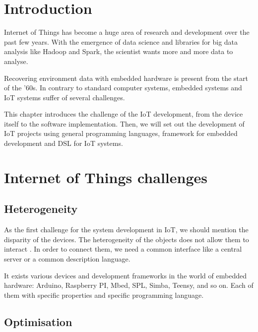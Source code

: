 \label{cha:iot_challenge}

\section{Introduction}
\label{sec:iot_challenge_intro}

Internet of Things has become a huge area of research and development over the past few
years. With the emergence of data science and libraries for big data analysis
like \gls{Hadoop} and \gls{Spark}, the scientist wants more and more data to
analyse.

Recovering environment data with embedded hardware is present from the start of
the '60s\cite{Community2017}. In contrary to standard computer systems, embedded
systems and \gls{IoT} systems suffer of several challenges.

This chapter introduces the challenge of the \gls{IoT} development, from the device
itself to the software implementation. Then, we will set out the development of
\gls{IoT} projects using general programming languages, framework for embedded
development and \gls{DSL} for \gls{IoT} systems.

\section{Internet of Things challenges}
\label{sec:iot_challenges}

\subsection{Heterogeneity}
\label{sec:heterogeneity}

As the first challenge for the system development in \gls{IoT}, we should
mention the disparity of the devices. The heterogeneity of the objects does not
allow them to interact \cite{midgar}. In order to connect them, we need a
common interface like a central server or a common description language.

It exists various devices and development frameworks in the world of
embedded hardware: Arduino, Raspberry PI, Mbed, SPL, Simba, Teensy, and so
on. Each of them with specific properties and specific programming language.

\subsection{Optimisation}
\label{sec:iot_challenge_optimisation}

